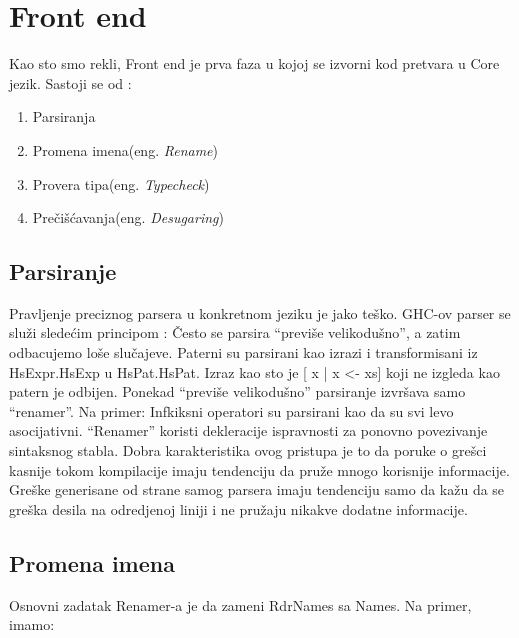 \section{Front end}
\label{sec:frontend}

Kao sto smo rekli, Front end je prva faza u kojoj se izvorni kod pretvara u Core jezik. Sastoji se od :
	 \begin{enumerate}
	 	\item Parsiranja
	 	\item Promena imena(eng. \emph{Rename}) 
	 	\item Provera tipa(eng. \emph{Typecheck})
	 	\item Prečišćavanja(eng. \emph{Desugaring})
	 \end{enumerate}


\subsection{Parsiranje}
\label{subsec:podnaslovParse}

Pravljenje preciznog parsera u konkretnom jeziku je jako teško. GHC-ov parser se služi sledećim principom : Često se parsira “previše velikodušno”,  a zatim odbacujemo loše slučajeve.
Paterni su parsirani kao izrazi i transformisani iz 
HsExpr.HsExp u HsPat.HsPat. Izraz kao sto je [ x | x <- xs] koji ne izgleda kao patern je odbijen.
Ponekad “previše velikodušno” parsiranje izvršava samo “renamer”. Na primer:
Infkiksni operatori  su parsirani kao da su svi levo asocijativni. “Renamer” koristi dekleracije ispravnosti za ponovno povezivanje sintaksnog stabla. Dobra karakteristika ovog pristupa je to da poruke o grešci kasnije  tokom kompilacije imaju tendenciju da pruže mnogo korisnije informacije. Greške generisane od strane samog parsera imaju tendenciju samo da kažu da se greška desila na odredjenoj liniji i ne pružaju nikakve dodatne informacije.

\subsection{Promena imena}
\label{subsec:podnaslovRename}

Osnovni zadatak Renamer-a je da zameni RdrNames sa Names. Na primer, imamo:

